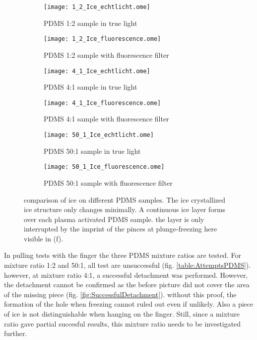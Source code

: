 \begin{figure}[hbt!]
	\centering
	\begin{subfigure}[]{0.45\textwidth}
		\centering
		\texttt{[image: 1\_2\_Ice\_echtlicht.ome]}
		\caption{PDMS 1:2 sample in true light}
	\end{subfigure}
	\begin{subfigure}[]{0.45\textwidth}
		\centering
		\texttt{[image: 1\_2\_Ice\_fluorescence.ome]}
		\caption{PDMS 1:2 sample with fluorescence filter}
	\end{subfigure}
	\begin{subfigure}[]{0.45\textwidth}
		\centering
		\texttt{[image: 4\_1\_Ice\_echtlicht.ome]}
		\caption{PDMS 4:1 sample in true light}
	\end{subfigure}
	\begin{subfigure}[]{0.45\textwidth}
		\centering
		\texttt{[image: 4\_1\_Ice\_fluorescence.ome]}
		\caption{PDMS 4:1 sample with fluorescence filter}
	\end{subfigure}
	\begin{subfigure}[]{0.45\textwidth}
		\centering
		\texttt{[image: 50\_1\_Ice\_echtlicht.ome]}
		\caption{PDMS 50:1 sample in true light}
	\end{subfigure}
	\begin{subfigure}[]{0.45\textwidth}
		\centering
		\texttt{[image: 50\_1\_Ice\_fluorescence.ome]}
		\caption{PDMS 50:1 sample with fluorescence filter}
		\label{fig:VglPDMSicemixtureratio_f}
	\end{subfigure}
	\caption{comparison of ice on different PDMS samples. The ice crystallized ice structure only changes minimally. A continuous ice layer forms over each plasma activated PDMS sample. the layer is only interrupted by the imprint of the pinces at plunge-freezing here visible in (f).}
	\label{fig:VglPDMSicemixtureratio}
\end{figure}

In pulling tests with the finger the three PDMS mixture ratios are tested. For mixture ratio 1:2 and 50:1, all test are unsuccessful (fig. \ref{table:AttemptsPDMS}). however, at mixture ratio 4:1, a successful detachment was performed. However, the detachment cannot be confirmed as the before picture did not cover the area of the missing piece (fig. \ref{fig:SuccessfulDetachment}). without this proof, the formation of the hole when freezing cannot ruled out even if unlikely. Also a piece of ice is not distinguishable when hanging on the finger. Still, since a mixture ratio gave partial succesful results, this mixture ratio needs to be investigated further.

